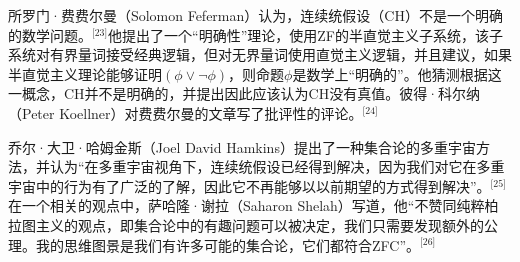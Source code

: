 所罗门·费费尔曼（Solomon Feferman）认为，连续统假设（CH）不是一个明确的数学问题。\(^\text{[23]}\)他提出了一个“明确性”理论，使用ZF的半直觉主义子系统，该子系统对有界量词接受经典逻辑，但对无界量词使用直觉主义逻辑，并且建议，如果半直觉主义理论能够证明\( (\phi \lor \neg \phi) \)，则命题\( \phi \)是数学上“明确的”。他猜测根据这一概念，CH并不是明确的，并提出因此应该认为CH没有真值。彼得·科尔纳（Peter Koellner）对费费尔曼的文章写了批评性的评论。\(^\text{[24]}\)

乔尔·大卫·哈姆金斯（Joel David Hamkins）提出了一种集合论的多重宇宙方法，并认为“在多重宇宙视角下，连续统假设已经得到解决，因为我们对它在多重宇宙中的行为有了广泛的了解，因此它不再能够以以前期望的方式得到解决”。\(^\text{[25]}\)在一个相关的观点中，萨哈隆·谢拉（Saharon Shelah）写道，他“不赞同纯粹柏拉图主义的观点，即集合论中的有趣问题可以被决定，我们只需要发现额外的公理。我的思维图景是我们有许多可能的集合论，它们都符合ZFC”。\(^\text{[26]}\)